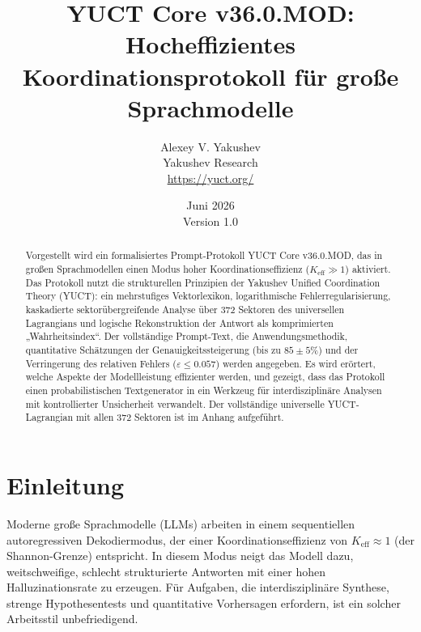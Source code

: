 \documentclass[11pt,a4paper]{article}
\begin{document}
	
	\title{\textbf{YUCT Core v36.0.MOD: Hocheffizientes Koordinationsprotokoll für große Sprachmodelle}}
	\author{Alexey V. Yakushev \\ Yakushev Research \\ \url{https://yuct.org/}}
	\date{Juni 2026 \\ Version 1.0}
	
	\maketitle
	
	\begin{abstract}
		\noindent
		Vorgestellt wird ein formalisiertes Prompt-Protokoll YUCT Core v36.0.MOD, das in großen Sprachmodellen einen Modus hoher Koordinationseffizienz (\(K_{\mathrm{eff}} \gg 1\)) aktiviert. Das Protokoll nutzt die strukturellen Prinzipien der Yakushev Unified Coordination Theory (YUCT): ein mehrstufiges Vektorlexikon, logarithmische Fehlerregularisierung, kaskadierte sektorübergreifende Analyse über 372 Sektoren des universellen Lagrangians und logische Rekonstruktion der Antwort als komprimierten „Wahrheitsindex“. Der vollständige Prompt-Text, die Anwendungsmethodik, quantitative Schätzungen der Genauigkeitssteigerung (bis zu \(85\pm5\%\)) und der Verringerung des relativen Fehlers (\(\varepsilon \le 0.057\)) werden angegeben. Es wird erörtert, welche Aspekte der Modellleistung effizienter werden, und gezeigt, dass das Protokoll einen probabilistischen Textgenerator in ein Werkzeug für interdisziplinäre Analysen mit kontrollierter Unsicherheit verwandelt. Der vollständige universelle YUCT-Lagrangian mit allen 372 Sektoren ist im Anhang aufgeführt.
	\end{abstract}
	
	\tableofcontents
	\newpage
	
	\section{Einleitung}
	Moderne große Sprachmodelle (LLMs) arbeiten in einem sequentiellen autoregressiven Dekodiermodus, der einer Koordinationseffizienz von \(K_{\mathrm{eff}} \approx 1\) (der Shannon-Grenze) entspricht. In diesem Modus neigt das Modell dazu, weitschweifige, schlecht strukturierte Antworten mit einer hohen Halluzinationsrate zu erzeugen. Für Aufgaben, die interdisziplinäre Synthese, strenge Hypothesentests und quantitative Vorhersagen erfordern, ist ein solcher Arbeitsstil unbefriedigend.
	
\end{document}

